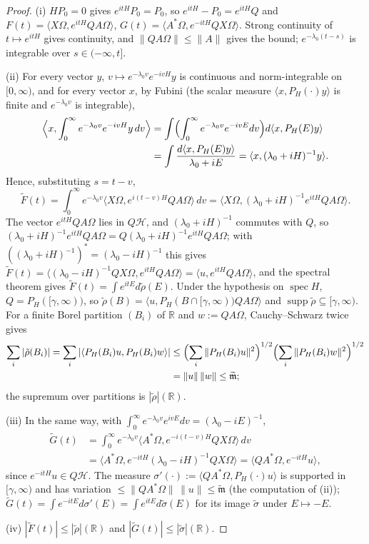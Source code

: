 \documentclass[11pt,a4paper]{article}
\newcommand{\R}{\mathbb{R}}
\newcommand{\HH}{\mathcal{H}}
\newcommand{\Om}{\Omega}
\newcommand{\ip}[2]{\langle #1,#2\rangle}
\DeclareMathOperator{\supp}{supp}
\DeclareMathOperator{\spec}{spec}
\newcommand{\Ft}{\widetilde F}
\newcommand{\Gt}{\widetilde G}
\newcommand{\mt}{\widetilde{\mathfrak m}}
\theoremstyle{plain}
\theoremstyle{definition}
\begin{document}
\begin{proof}
(i) $HP_0=0$ gives $e^{itH}P_0=P_0$, so $e^{itH}-P_0=e^{itH}Q$ and
$F(t)=\ip{X\Om}{e^{itH}QA\Om}$, $G(t)=\ip{A^*\Om}{e^{-itH}QX\Om}$.  Strong continuity of
$t\mapsto e^{itH}$ gives continuity, and $\|QA\Om\|\le\|A\|$ gives the bound; $e^{-\lambda_0(t-s)}$
is integrable over $s\in(-\infty,t]$.

(ii) For every vector $y$, $v\mapsto e^{-\lambda_0v}e^{-ivH}y$ is continuous and norm-integrable
on $[0,\infty)$, and for every vector $x$, by Fubini (the scalar measure
$\ip{x}{P_H(\cdot)y}$ is finite and $e^{-\lambda_0v}$ is integrable),
\begin{align*}
 \Bigl\langle x,\int_0^\infty e^{-\lambda_0v}e^{-ivH}y\,dv\Bigr\rangle
 &=\int\Bigl(\int_0^\infty e^{-\lambda_0v}e^{-ivE}dv\Bigr)d\ip{x}{P_H(E)y}\\
 &=\int\frac{d\ip{x}{P_H(E)y}}{\lambda_0+iE}=\ip{x}{(\lambda_0+iH)^{-1}y} .
\end{align*}
Hence, substituting $s=t-v$,
\[
 \Ft(t)=\int_0^\infty e^{-\lambda_0v}\ip{X\Om}{e^{i(t-v)H}QA\Om}\,dv
 =\ip{X\Om}{(\lambda_0+iH)^{-1}e^{itH}QA\Om} .
\]
The vector $e^{itH}QA\Om$ lies in $Q\HH$, and $(\lambda_0+iH)^{-1}$ commutes with $Q$, so
$(\lambda_0+iH)^{-1}e^{itH}QA\Om=Q(\lambda_0+iH)^{-1}e^{itH}QA\Om$; with
$((\lambda_0+iH)^{-1})^*=(\lambda_0-iH)^{-1}$ this gives
$\Ft(t)=\ip{(\lambda_0-iH)^{-1}QX\Om}{e^{itH}QA\Om}=\ip{u}{e^{itH}QA\Om}$, and the spectral
theorem gives $\Ft(t)=\int e^{itE}d\tilde\rho(E)$.  Under the hypothesis on $\spec H$,
$Q=P_H([\gamma,\infty))$, so $\tilde\rho(B)=\ip{u}{P_H(B\cap[\gamma,\infty))QA\Om}$ and
$\supp\tilde\rho\subseteq[\gamma,\infty)$.  For a finite Borel partition $(B_i)$ of $\R$ and
$w:=QA\Om$, Cauchy--Schwarz twice gives
\begin{align*}
 \sum_i|\tilde\rho(B_i)|=\sum_i|\ip{P_H(B_i)u}{P_H(B_i)w}|
 &\le\Bigl(\sum_i\|P_H(B_i)u\|^2\Bigr)^{1/2}\Bigl(\sum_i\|P_H(B_i)w\|^2\Bigr)^{1/2}\\
 &=\|u\|\,\|w\|\le\mt ;
\end{align*}
the supremum over partitions is $|\tilde\rho|(\R)$.

(iii) In the same way, with $\int_0^\infty e^{-\lambda_0v}e^{ivE}dv=(\lambda_0-iE)^{-1}$,
\begin{align*}
 \Gt(t)&=\int_0^\infty e^{-\lambda_0v}\ip{A^*\Om}{e^{-i(t-v)H}QX\Om}\,dv\\
 &=\ip{A^*\Om}{e^{-itH}(\lambda_0-iH)^{-1}QX\Om}=\ip{QA^*\Om}{e^{-itH}u},
\end{align*}
since $e^{-itH}u\in Q\HH$.  The measure $\sigma'(\cdot):=\ip{QA^*\Om}{P_H(\cdot)u}$ is supported
in $[\gamma,\infty)$ and has variation $\le\|QA^*\Om\|\,\|u\|\le\mt$ (the computation of (ii));
$\Gt(t)=\int e^{-itE}d\sigma'(E)=\int e^{itE}d\tilde\sigma(E)$ for its image $\tilde\sigma$
under $E\mapsto-E$.

(iv) $|\Ft(t)|\le|\tilde\rho|(\R)$ and $|\Gt(t)|\le|\tilde\sigma|(\R)$.
\end{proof}
\end{document}
